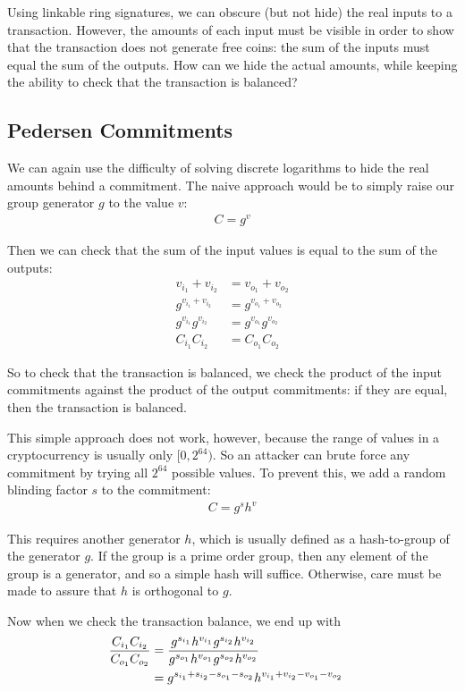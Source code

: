 \documentclass{article}
\begin{document}
Using linkable ring signatures, we can obscure (but not hide) the real inputs to a transaction.  However, the amounts of each input must be visible in order to show that the transaction does not generate free coins: the sum of the inputs must equal the sum of the outputs.  How can we hide the actual amounts, while keeping the ability to check that the transaction is balanced?


\subsection{Pedersen Commitments}

We can again use the difficulty of solving discrete logarithms to hide the real amounts behind a commitment.  The naive approach would be to simply raise our group generator $g$ to the value $v$:
\begin{align}
  C=g^v
\end{align}

Then we can check that the sum of the input values is equal to the sum of the outputs:
\begin{align}
  v_{i_1} + v_{i_2} &= v_{o_1} + v_{o_2}\\
  g^{v_{i_1} + v_{i_2}} &= g^{v_{o_1} + v_{o_2}}\\
  g^{v_{i_1}} g^{v_{i_2}} &= g^{v_{o_1}} g^{v_{o_2}}\\
  C_{i_1} C_{i_2} &= C_{o_1} C_{o_2}
\end{align}
  
So to check that the transaction is balanced, we check the product of the input commitments against the product of the output commitments: if they are equal, then the transaction is balanced.

This simple approach does not work, however, because the range of values in a cryptocurrency is usually only $[0, 2^{64})$.  So an attacker can brute force any commitment by trying all $2^{64}$ possible values.  To prevent this, we add a random blinding factor $s$ to the commitment:
\begin{align}
  C = g^s h^v
\end{align}
  
This requires another generator $h$, which is usually defined as a hash-to-group of the generator $g$.  If the group is a prime order group, then any element of the group is a generator, and so a simple hash will suffice.  Otherwise, care must be made to assure that $h$ is orthogonal to $g$.

Now when we check the transaction balance, we end up with
\begin{align}
  \frac{C_{i_1} C_{i_2}}{C_{o_1} C_{o_2}} &= \frac{g^{s_{i_1}} h^{v_{i_1}} g^{s_{i_2}} h^{v_{i_2}}}{g^{s_{o_1}} h^{v_{o_1}} g^{s_{o_2}} h^{v_{o_2}}}
  \cr &= g^{s_{i_1} + s_{i_2} - s_{o_1} - s_{o_2}} h^{v_{i_1} + v_{i_2} - v_{o_1} - v_{o_2}}
\end{align}
\end{document}
